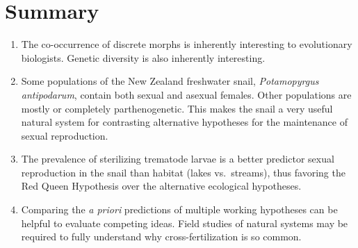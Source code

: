 \documentclass[
  letterpaper,
]{book}
\begin{document}
\hypertarget{summary-2}{%
\section{Summary}\label{summary-2}}

\begin{enumerate}
\def\labelenumi{\arabic{enumi}.}
\item
  The co-occurrence of discrete morphs is inherently interesting to
  evolutionary biologists. Genetic diversity is also inherently
  interesting.
\item
  Some populations of the New Zealand freshwater snail,
  \emph{Potamopyrgus antipodarum}, contain both sexual and asexual
  females. Other populations are mostly or completely parthenogenetic.
  This makes the snail a very useful natural system for contrasting
  alternative hypotheses for the maintenance of sexual reproduction.
\item
  The prevalence of sterilizing trematode larvae is a better predictor
  sexual reproduction in the snail than habitat (lakes vs.~streams),
  thus favoring the Red Queen Hypothesis over the alternative ecological
  hypotheses.
\item
  Comparing the \emph{a priori} predictions of multiple working
  hypotheses can be helpful to evaluate competing ideas. Field studies
  of natural systems may be required to fully understand why
  cross-fertilization is so common.
\end{enumerate}
\end{document}
